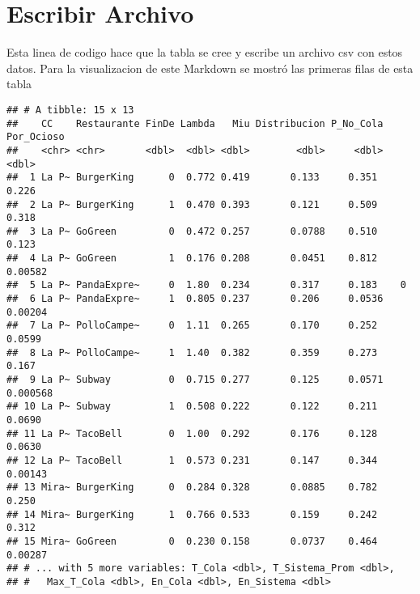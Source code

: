 \documentclass[]{article}
\newenvironment{Shaded}{\begin{snugshade}}{\end{snugshade}}
\newcommand{\CommentTok}[1]{\textcolor[rgb]{0.56,0.35,0.01}{\textit{#1}}}
\newcommand{\DataTypeTok}[1]{\textcolor[rgb]{0.13,0.29,0.53}{#1}}
\newcommand{\DecValTok}[1]{\textcolor[rgb]{0.00,0.00,0.81}{#1}}
\newcommand{\KeywordTok}[1]{\textcolor[rgb]{0.13,0.29,0.53}{\textbf{#1}}}
\newcommand{\NormalTok}[1]{#1}
\newcommand{\OperatorTok}[1]{\textcolor[rgb]{0.81,0.36,0.00}{\textbf{#1}}}
\newcommand{\OtherTok}[1]{\textcolor[rgb]{0.56,0.35,0.01}{#1}}
\newcommand{\StringTok}[1]{\textcolor[rgb]{0.31,0.60,0.02}{#1}}
\begin{document}
\hypertarget{escribir-archivo}{%
\section{Escribir Archivo}\label{escribir-archivo}}

Esta linea de codigo hace que la tabla se cree y escribe un archivo csv
con estos datos. Para la visualizacion de este Markdown se mostró las
primeras filas de esta tabla

\begin{Shaded}
\end{Shaded}

\begin{verbatim}
## # A tibble: 15 x 13
##    CC    Restaurante FinDe Lambda   Miu Distribucion P_No_Cola Por_Ocioso
##    <chr> <chr>       <dbl>  <dbl> <dbl>        <dbl>     <dbl>      <dbl>
##  1 La P~ BurgerKing      0  0.772 0.419       0.133     0.351    0.226   
##  2 La P~ BurgerKing      1  0.470 0.393       0.121     0.509    0.318   
##  3 La P~ GoGreen         0  0.472 0.257       0.0788    0.510    0.123   
##  4 La P~ GoGreen         1  0.176 0.208       0.0451    0.812    0.00582 
##  5 La P~ PandaExpre~     0  1.80  0.234       0.317     0.183    0       
##  6 La P~ PandaExpre~     1  0.805 0.237       0.206     0.0536   0.00204 
##  7 La P~ PolloCampe~     0  1.11  0.265       0.170     0.252    0.0599  
##  8 La P~ PolloCampe~     1  1.40  0.382       0.359     0.273    0.167   
##  9 La P~ Subway          0  0.715 0.277       0.125     0.0571   0.000568
## 10 La P~ Subway          1  0.508 0.222       0.122     0.211    0.0690  
## 11 La P~ TacoBell        0  1.00  0.292       0.176     0.128    0.0630  
## 12 La P~ TacoBell        1  0.573 0.231       0.147     0.344    0.00143 
## 13 Mira~ BurgerKing      0  0.284 0.328       0.0885    0.782    0.250   
## 14 Mira~ BurgerKing      1  0.766 0.533       0.159     0.242    0.312   
## 15 Mira~ GoGreen         0  0.230 0.158       0.0737    0.464    0.00287 
## # ... with 5 more variables: T_Cola <dbl>, T_Sistema_Prom <dbl>,
## #   Max_T_Cola <dbl>, En_Cola <dbl>, En_Sistema <dbl>
\end{verbatim}
\end{document}
